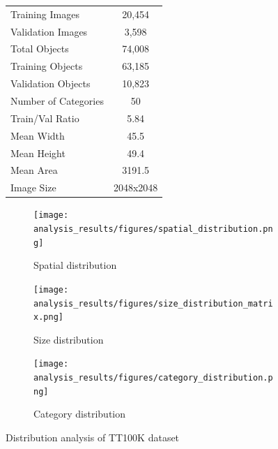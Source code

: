 \documentclass[10pt]{article}
\begin{document}
\begin{figure}[H]
\begin{minipage}{0.5\textwidth}
\begin{tabular}{lc}
            Training Images & 20,454 \\
            Validation Images & 3,598 \\
            Total Objects & 74,008 \\
            Training Objects & 63,185 \\
            Validation Objects & 10,823 \\
            Number of Categories & 50 \\
            Train/Val Ratio & 5.84 \\
            Mean Width & 45.5 \\
            Mean Height & 49.4 \\
            Mean Area & 3191.5 \\
            Image Size & 2048x2048 \\
            \bottomrule
        \end{tabular}
        \label{tab:dataset_stats}
    \end{minipage}
\end{figure}

\begin{figure}[H]
    \centering
    \begin{subfigure}{0.32\textwidth}
        \centering
        \texttt{[image: analysis\_results/figures/spatial\_distribution.png]}
        \caption{Spatial distribution}
        \label{fig:spatial_distribution}
    \end{subfigure}
    \hfill
    \begin{subfigure}{0.32\textwidth}
        \centering
        \texttt{[image: analysis\_results/figures/size\_distribution\_matrix.png]}
        \caption{Size distribution}
    \end{subfigure}
    \hfill
    \begin{subfigure}{0.32\textwidth}
        \centering
        \texttt{[image: analysis\_results/figures/category\_distribution.png]}
        \caption{Category distribution}
    \end{subfigure}
    \caption{Distribution analysis of TT100K dataset}
    \label{fig:distributions}
\end{figure}
\end{document}
